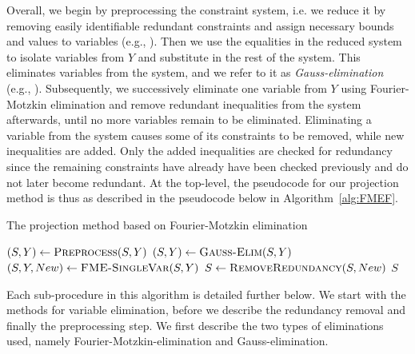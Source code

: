 \documentclass[citeauthoryear]{llncs}
\begin{document}
Overall, we begin by preprocessing the constraint system, i.e. we reduce it by removing easily identifiable redundant constraints and assign necessary bounds and values to variables (e.g., \cite{brearley75,andersen95,maros}).
Then we use the equalities in the reduced system to isolate variables from $Y$ and substitute in the rest of the system. This eliminates variables from the system, and we refer to it as \emph{Gauss-elimination} (e.g., \cite{duffin74,simon05}).  
Subsequently, we successively eliminate one variable from $Y$ using Fourier-Motzkin elimination and remove redundant inequalities from the system afterwards, until no more variables remain to be eliminated. Eliminating a variable from the system causes some of its constraints to be removed, while new inequalities are added. Only the added inequalities are checked for redundancy since the remaining constraints have already have been checked previously and do not later become redundant. At the top-level, the pseudocode for our projection method is thus as described in the pseudocode below in Algorithm~\ref{alg:FMEF}. 
\begin{algorithm}
\caption{The projection method based on Fourier-Motzkin elimination} 
\label{alg:FMEF}
\begin{algorithmic}
	\State $(S,Y)\gets \Call{Preprocess}{S,Y}$
	\State $(S,Y)\gets\Call{Gauss-Elim}{S,Y}$
		\State $(S, Y, New )\gets\Call{FME-SingleVar}{S,Y}$
		\State $S\gets\Call{RemoveRedundancy}{S,New}$
	\EndWhile
	\State \Return $S$
\EndFunction
\end{algorithmic}
\end{algorithm}
Each sub-procedure in this algorithm is detailed further below. We start with the methods for variable elimination, before we describe the redundancy removal and finally the preprocessing step. We first describe the two types of eliminations used, namely Fourier-Motzkin-elimination and Gauss-elimination. 
\end{document}
